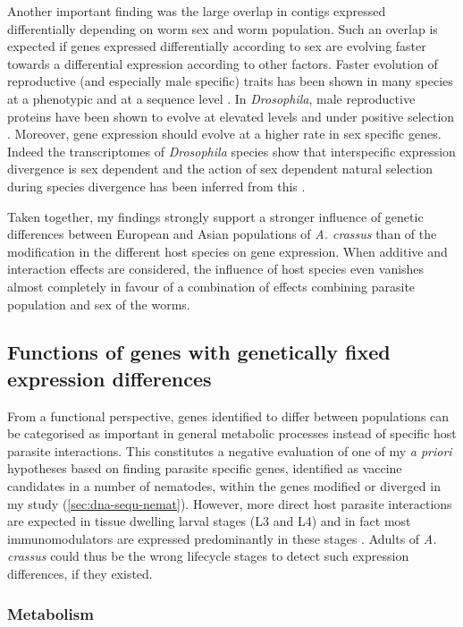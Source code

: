 Another important finding was the large overlap in contigs expressed
differentially depending on worm sex and worm population. Such an
overlap is expected if genes expressed differentially according to sex
are evolving faster towards a differential expression according to
other factors. Faster evolution of reproductive (and especially male
specific) traits has been shown in many species at a phenotypic and at
a sequence level \cite{pmid15795858}. In \textit{Drosophila}, male
reproductive proteins have been shown to evolve at elevated levels and
under positive selection \cite{pmid11404480}. Moreover, gene
expression should evolve at a higher rate in sex specific genes.
Indeed the transcriptomes of \textit{Drosophila} species show that
interspecific expression divergence is sex dependent and the action of
sex dependent natural selection during species divergence has been
inferred from this \cite{pmid15034135,pmid19720861}.

Taken together, my findings strongly support a stronger influence of
genetic differences between European and Asian populations of
\textit{A. crassus} than of the modification in the different host
species on gene expression. When additive and interaction effects are
considered, the influence of host species even vanishes almost
completely in favour of a combination of effects combining parasite
population and sex of the worms.

\subsection{Functions of genes with genetically fixed expression
  differences}
\label{sec:function-genes-with}

From a functional perspective, genes identified to differ between
populations can be categorised as important in general metabolic
processes instead of specific host parasite interactions. This
constitutes a negative evaluation of one of my \textit{a priori}
hypotheses based on finding parasite specific genes, identified as
vaccine candidates in a number of nematodes, within the genes modified
or diverged in my study (\ref{sec:dna-sequ-nemat}). However, more
direct host parasite interactions are expected in tissue dwelling
larval stages (L3 and L4) and in fact most immunomodulators are
expressed predominantly in these stages
\cite{maizels_helminth_2004}. Adults of \textit{A. crassus} could thus
be the wrong lifecycle stages to detect such expression differences,
if they existed.

\subsubsection{Metabolism}
\label{sec:metabolism}


